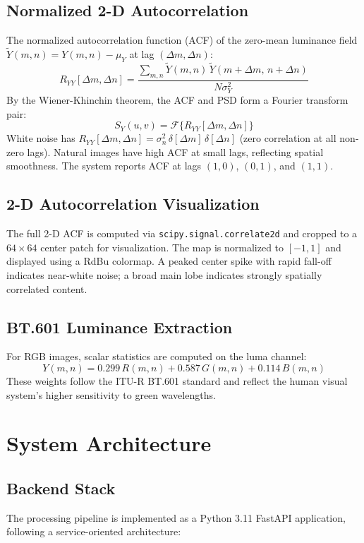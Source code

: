 \documentclass[10pt,conference]{IEEEtran}
\begin{document}
\subsection{Normalized 2-D Autocorrelation}
The normalized autocorrelation function (ACF) of the zero-mean luminance field $\tilde{Y}(m,n) = Y(m,n) - \mu_Y$ at lag $(\Delta m, \Delta n)$:
\begin{equation}
R_{YY}[\Delta m, \Delta n] = \frac{\displaystyle\sum_{m,n}\tilde{Y}(m,n)\,\tilde{Y}(m+\Delta m,\,n+\Delta n)}{N\sigma_Y^2}
\end{equation}
By the Wiener-Khinchin theorem, the ACF and PSD form a Fourier transform pair:
\begin{equation}
S_Y(u,v) = \mathcal{F}\{R_{YY}[\Delta m,\Delta n]\}
\end{equation}
White noise has $R_{YY}[\Delta m,\Delta n] = \sigma_n^2\,\delta[\Delta m]\,\delta[\Delta n]$ (zero correlation at all non-zero lags). Natural images have high ACF at small lags, reflecting spatial smoothness. The system reports ACF at lags $(1,0)$, $(0,1)$, and $(1,1)$.

\subsection{2-D Autocorrelation Visualization}
The full 2-D ACF is computed via \texttt{scipy.signal.correlate2d} and cropped to a $64\times64$ center patch for visualization. The map is normalized to $[-1,1]$ and displayed using a RdBu colormap. A peaked center spike with rapid fall-off indicates near-white noise; a broad main lobe indicates strongly spatially correlated content.

\subsection{BT.601 Luminance Extraction}
For RGB images, scalar statistics are computed on the luma channel:
\begin{equation}
Y(m,n) = 0.299\,R(m,n) + 0.587\,G(m,n) + 0.114\,B(m,n)
\end{equation}
These weights follow the ITU-R BT.601 standard and reflect the human visual system's higher sensitivity to green wavelengths.

\section{System Architecture}

\subsection{Backend Stack}
The processing pipeline is implemented as a Python 3.11 FastAPI application, following a service-oriented architecture:
\end{document}
